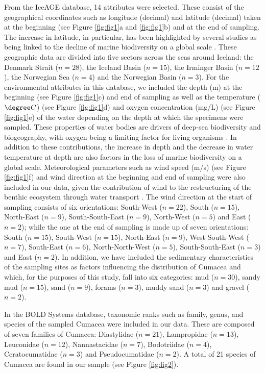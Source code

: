 From the IceAGE database, 14 attributes were selected. These consist of the geographical coordinates such as longitude (decimal) and latitude (decimal) taken at the beginning (see Figure \ref{fig:fig1}a and \ref{fig:fig1}b) and at the end of sampling. The increase in latitude, in particular, has been highlighted by several studies as being linked to the decline of marine biodiversity on a global scale \citep{lambshead_latitudinal_2000,gage_diversity_2004}. These geographic data are divided into five sectors across the seas around Iceland: the Denmark Strait ($n=28$), the Iceland Basin ($n=15$), the Irminger Basin ($n=12$), the Norwegian Sea ($n=4$) and the Norwegian Basin ($n=3$). For the environmental attributes in this database, we included the depth (m) at the beginning (see Figure \ref{fig:fig1}c) and end of sampling as well as the temperature ($\degree C$) (see Figure \ref{fig:fig1}d) and oxygen concentration (mg/L) (see Figure \ref{fig:fig1}e) of the water depending on the depth at which the specimens were sampled. These properties of water bodies are drivers of deep-sea biodiversity and biogeography, with oxygen being a limiting factor for living organisms \citep{keeling_ocean_2010}. In addition to these contributions, the increase in depth \citep{rex_global_2006,costello_marine_2017} and the decrease in water temperature at depth \citep{lambshead_latitudinal_2000} are also factors in the loss of marine biodiversity on a global scale. Meteorological parameters such as wind speed (m/s) (see Figure \ref{fig:fig1}f) and wind direction at the beginning and end of sampling were also included in our data, given the contribution of wind to the restructuring of the benthic ecosystem through water transport \citep{waga_recent_2020,saeedi_environmental_2022}. The wind direction at the start of sampling consists of six orientations: South-West ($n=22$), South ($n=15$), North-East ($n=9$), South-South-East ($n=9$), North-West ($n=5$) and East ($n=2$); while the one at the end of sampling is made up of seven orientations: South ($n=15$), South-West ($n=15$), North-East ($n=9$), West-South-West ($n=7$), South-East ($n=6$), North-North-West ($n=5$), South-South-East ($n=3$) and East ($n=2$). In addition, we have included the sedimentary characteristics of the sampling sites as factors influencing the distribution of Cumacea \citep{uhlir_adding_2021} and which, for the purposes of this study, fall into six categories: mud ($n=30$), sandy mud ($n=15$), sand ($n=9$), forams ($n=3$), muddy sand ($n=3$) and gravel ($n=2$).

In the BOLD Systems database, taxonomic ranks such as family, genus, and species of the sampled Cumacea were included in our data. These are composed of seven families of Cumacea: Diastylidae ($n=21$), Lampropidae ($n=13$), Leuconidae ($n=12$), Nannastacidae ($n=7$), Bodotriidae ($n=4$), Ceratocumatidae ($n=3$) and Pseudocumatidae ($n=2$). A total of 21 species of Cumacea are found in our sample (see Figure \ref{fig:fig2}).

